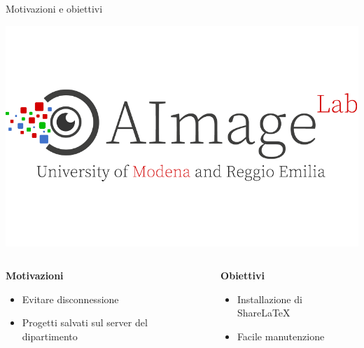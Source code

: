 \documentclass[aspectratio=169]{beamer}
\begin{document}
\begin{frame}{Motivazioni e obiettivi}
    \begin{center}
        \vspace{-1.5cm}
        \includegraphics[scale=1.5]{img/aimagelab_logo.png}
    \end{center}
    \vspace{-1.5cm}
    \begin{columns}[T]
        \begin{column}{0.5\textwidth}
            \textbf{Motivazioni}
            \begin{itemize}
                \item Evitare disconnessione
                \item Progetti salvati sul server del dipartimento
            \end{itemize}
        \end{column}
        \begin{column}{0.5\textwidth}
            \textbf{Obiettivi}
            \begin{itemize}
                \item Installazione di ShareLaTeX
                \item Facile manutenzione
            \end{itemize}
        \end{column}
    \end{columns}
\end{frame}
\end{document}
